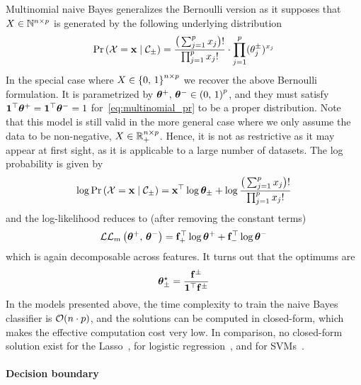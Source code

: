 Multinomial naive Bayes generalizes the Bernoulli version
as it supposes that $X \in \mathbb{N}^{n \times p}$ is generated by the following underlying distribution
\begin{equation}\label{eq:multinomial_pr}
\Pr\left( \mathcal{X} = \mathbf{x} \mid \mathcal{C}_\pm \right) =
\frac{\big( \sum_{j = 1}^p x_j \big)!}
{\prod_{j = 1}^p x_j!} \cdot \prod_{j = 1}^p (\theta^\pm_j)^{x_j}
\end{equation}
In the special case where $X \in \left\{ 0,\, 1 \right\}^{n \times p}$ we recover the above Bernoulli formulation.
It is parametrized by $\bm{\theta}^+,\, \bm{\theta}^- \in \left( 0,\, 1 \right)^p$, and they must satisfy
$\mathbf{1}^\top\bm{\theta}^+ = \mathbf{1}^\top\bm{\theta}^- = 1$ for~\ref{eq:multinomial_pr} to be a proper distribution.
Note that this model is still valid in the more general case
where we only assume the data to be non-negative, $X \in \mathbb{R}_+^{n \times p}$.
Hence, it is not as restrictive as it may appear at first sight,
as it is applicable to a large number of datasets.
The log probability is given by
\begin{equation*}
    \log\Pr\left( \mathcal{X} = \mathbf{x} \mid \mathcal{C}_\pm \right) =
    \mathbf{x}^\top\log\bm{\theta}_\pm + \log\frac{\big(\sum_{j = 1}^p x_j\big)!}{\prod_{j = 1}^p x_j!}
\end{equation*}
and the log-likelihood reduces to (after removing the constant terms)
\begin{equation}\label{eq:multinomial_snb_ll}
\mathcal{L}\mathcal{L}_m\left( \bm{\theta}^+,\, \bm{\theta}^- \right) = \mathbf{f}_+^\top\log\bm{\theta}^+ + \mathbf{f}_-^\top\log\bm{\theta}^-
\end{equation}
which is again decomposable across features.
It turns out that the optimums are
\begin{equation*}
    \bm{\theta}_\pm^\star = \frac{\mathbf{f}^\pm}{\mathbf{1}^\top\mathbf{f}^\pm}
\end{equation*}
\bigbreak
In the models presented above, the time complexity to train the naive Bayes classifier is $\mathcal{O}(n \cdot p)$,
and the solutions can be computed in closed-form, which makes the effective computation cost very low.
In comparison, no closed-form solution exist for the Lasso~\citep{lasso},
for logistic regression~\citep{logistic_regression}, and for SVMs~\citep{svm}.

\paragraph{Decision boundary}\label{subsubsec:nb_bound}


